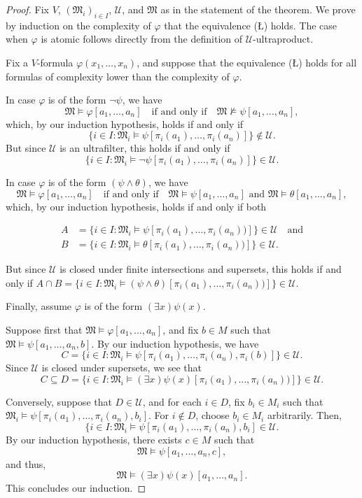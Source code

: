 \documentclass{scrartcl}
\renewcommand{\phi}{\varphi}
\newcommand{\FM}{\mathfrak{M}}
\newcommand{\SU}{\mathscr{U}}
\begin{document}
\begin{proof}
Fix $V$, $(\mathfrak{M}_i)_{i\in I}$, $\SU$, and $\FM$ as in the statement of the theorem. We prove by induction on the complexity of $\phi$ that the equivalence (Ł) holds. The case when $\phi$ is atomic follows directly from the definition of $\SU$-ultraproduct.

Fix a $V$-formula $\phi(x_1,\dots, x_n)$, and suppose that the equivalence (Ł) holds for all formulas of complexity lower than the complexity of $\phi$.

In case $\phi$ is of the form $\neg\psi$, we have 
\[
\mathfrak{M} \models \phi[a_1,\dots,a_n]  \quad \text{if and only if} \quad  \mathfrak{M}\not\models\psi[a_1,\dots,a_n],
\]
which, by our induction hypothesis, holds if and only if
\[
\{i\in I\colon\mathfrak{M}_i\models\psi[\pi_i(a_1), \dots, \pi_i(a_n)] \} \not \in\mathscr{U}.
\]
But since $\SU$ is an ultrafilter, this holds if and only if
\[
\{i\in I\colon\mathfrak{M}_i\models\neg\psi[\pi_i(a_1), \dots, \pi_i(a_n)] \}\in\mathscr{U}.
\]


In case $\phi$ is of the form $(\psi\wedge\theta)$, we have 
\[
\mathfrak{M} \models \phi[a_1,\dots,a_n]  \quad \text{if and only if} \quad  \mathfrak{M}\models\psi[a_1,\dots,a_n] \text{ and } \mathfrak{M}\models\theta[a_1,\dots,a_n],
\]
which, by our induction hypothesis, holds if and only if both

\begin{align*}
A &= \{i\in I\colon\mathfrak{M}_i\models\psi[\pi_i(a_1), \dots, \pi_i(a_n))] \} \in\mathscr{U} \quad \text{and} \\
B &= \{i\in I\colon\mathfrak{M}_i\models\theta[\pi_i(a_1), \dots, \pi_i(a_n))] \} \in \mathscr{U}.
\end{align*}

But since $\SU$ is closed under finite intersections and supersets, this holds if and only if $A \cap B = \{i\in I\colon\mathfrak{M}_i\models(\psi\wedge\theta)[\pi_i(a_1), \dots, \pi_i(a_n))]\}\in\mathscr{U}$.


Finally, assume $\phi$ is of the form $(\exists x)\psi(x)$.

Suppose first that $\FM\models\phi[a_1,\dots,a_n]$, and fix $b\in M$ such that $\FM\models\psi[a_1,\dots,a_n,b]$. By our induction hypothesis, we have
\[
C = \{i\in I\colon \mathfrak{M}_i\models\psi[\pi_i(a_1), \dots, \pi_i(a_n),\pi_i(b)] \}\in\mathscr{U}.
\]
Since $\SU$ is closed under supersets, we see that
\[
C \subseteq D = \{i\in I\colon\mathfrak{M}_i\models (\exists x) \psi(x)[\pi_i(a_1), \dots, \pi_i(a_n))]\} \in \SU.
\]

Conversely, suppose that $D \in \SU$, and for each $i\in D$, fix $b_i\in M_i$ such that $\mathfrak{M}_i\models\psi[\pi_i(a_1), \dots, \pi_i(a_n),b_i]$. For  $i\not \in D$, choose $b_i \in M_i$ arbitrarily. Then, 
\[
\{i\in I \colon \mathfrak{M}_i \models \psi [\pi_i(a_1), \dots, \pi_i(a_n), b_i]\in \SU. 
\]
By our induction hypothesis, there exists $c \in M$ such that 
 \[
\mathfrak{M}\models\psi[a_1,\dots, a_n, c],
\]
and thus,
 \[
\mathfrak{M}\models(\exists x)\psi(x)[a_1,\dots,a_n].
\]
This concludes our induction.
\end{proof}
\end{document}
